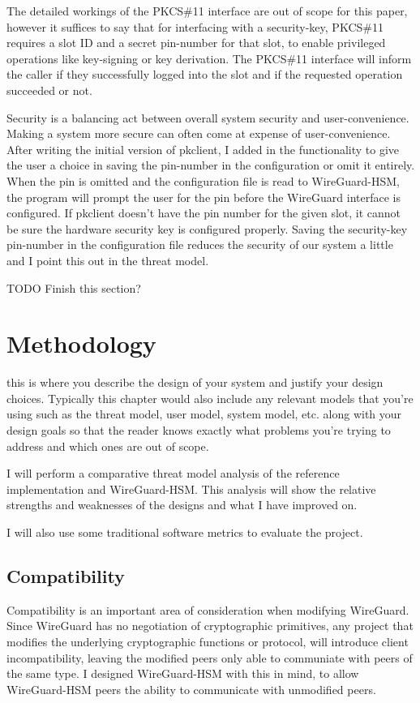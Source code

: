 \documentclass [11pt, proquest] {uwthesis}[2020/02/24]
\begin{document}
The detailed workings of the PKCS\#11 interface are out of scope for this paper, however it suffices to say that for interfacing with a security-key, PKCS\#11 requires a slot ID and a secret pin-number for that slot, to enable privileged operations like key-signing or key derivation. The PKCS\#11 interface will inform the caller if they successfully logged into the slot and if the requested operation succeeded or not.

Security is a balancing act between overall system security and user-convenience. Making a system more secure can often come at expense of user-convenience. After writing the initial version of pkclient, I added in the functionality to give the user a choice in saving the pin-number in the configuration or omit it entirely. When the pin is omitted and the configuration file is read to WireGuard-HSM, the program will prompt the user for the pin before the WireGuard interface is configured. If pkclient doesn't have the pin number for the given slot, it cannot be sure the hardware security key is configured properly. Saving the security-key pin-number in the configuration file reduces the security of our system a little and I point this out in the threat model. 

TODO Finish this section?



\chapter {Methodology}

this is where you describe the design of your system and justify your design choices.  Typically this chapter would also include any relevant models that you're using such as the threat model, user model, system model, etc. along with your design goals so that the reader knows exactly what problems you're trying to address and which ones are out of scope.

I will perform a comparative threat model analysis of the reference implementation and WireGuard-HSM. This analysis will show the relative strengths and weaknesses of the designs and what I have improved on.

I will also use some traditional software metrics to evaluate the project.


\section{Compatibility}
Compatibility is an important area of consideration when modifying WireGuard. Since WireGuard has no negotiation of cryptographic primitives, any project that modifies the underlying cryptographic functions or protocol, will introduce client incompatibility, leaving the modified peers only able to communiate with peers of the same type. I designed WireGuard-HSM with this in mind, to allow WireGuard-HSM peers the ability to communicate with unmodified peers.
\end{document}
